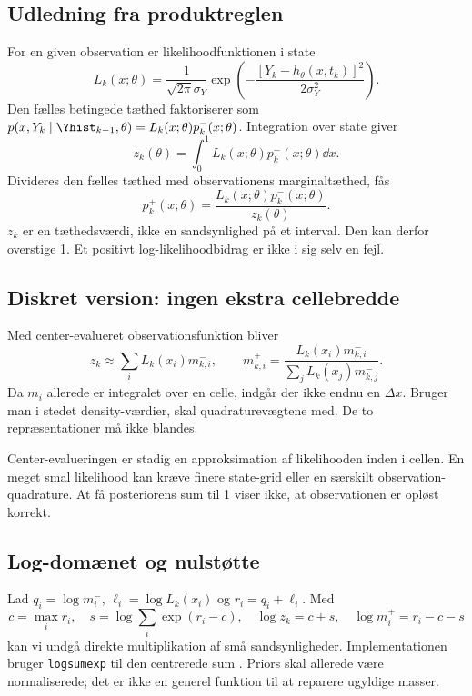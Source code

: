 \subsection{Udledning fra produktreglen}
For en given observation er likelihoodfunktionen i state
\begin{equation}
 L_k(x;\theta)=\frac{1}{\sqrt{2\pi}\sigma_Y}
 \exp\!\left(-\frac{[Y_k-h_\theta(x,t_k)]^2}{2\sigma_Y^2}\right).
 \label{eq:likelihood}
\end{equation}
Den fælles betingede tæthed faktoriserer som
\(p(x,Y_k\mid\Yhist_{k-1},\theta)=L_k(x;\theta)p_k^-(x;\theta)\).
Integration over state giver
\begin{equation}
 z_k(\theta)=\int_0^1 L_k(x;\theta)p_k^-(x;\theta)\dd x.
 \label{eq:evidence}
\end{equation}
Divideres den fælles tæthed med observationens marginaltæthed, fås
\begin{equation}
 \boxed{p_k^+(x;\theta)=\frac{L_k(x;\theta)p_k^-(x;\theta)}{z_k(\theta)}.}
 \label{eq:bayes}
\end{equation}
\(z_k\) er en tæthedsværdi, ikke en sandsynlighed på et interval. Den kan derfor overstige 1. Et positivt log-likelihoodbidrag er ikke i sig selv en fejl.

\subsection{Diskret version: ingen ekstra cellebredde}
Med center-evalueret observationsfunktion bliver
\begin{equation}
 z_k\approx\sum_i L_k(x_i) m_{k,i}^-,\qquad
 m_{k,i}^+=\frac{L_k(x_i)m_{k,i}^-}{\sum_jL_k(x_j)m_{k,j}^-}.
 \label{eq:discretebayes}
\end{equation}
Da \(m_i\) allerede er integralet over en celle, indgår der ikke endnu en \(\Delta x\). Bruger man i stedet density-værdier, skal quadraturevægtene med. De to repræsentationer må ikke blandes.

Center-evalueringen er stadig en approksimation af likelihooden inden i cellen. En meget smal likelihood kan kræve finere state-grid eller en særskilt observation-quadrature. At få posteriorens sum til 1 viser ikke, at observationen er opløst korrekt.

\subsection{Log-domænet og nulstøtte}
Lad \(q_i=\log m_i^-\), \(\ell_i=\log L_k(x_i)\) og \(r_i=q_i+\ell_i\). Med
\begin{equation}
 c=\max_i r_i,\quad s=\log\sum_i\exp(r_i-c),\quad
 \log z_k=c+s,\quad \log m_i^+=r_i-c-s
 \label{eq:logbayes}
\end{equation}
kan vi undgå direkte multiplikation af små sandsynligheder. Implementationen bruger \texttt{logsumexp} til den centrerede sum \cite{scipylog}. Priors skal allerede være normaliserede; det er ikke en generel funktion til at reparere ugyldige masser.

